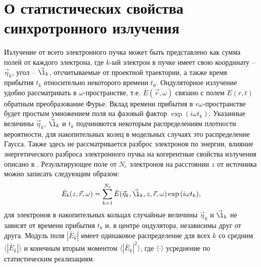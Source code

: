 \section{О статистических свойства синхротронного излучения}
Излучение от всего электронного пучка может быть представлено как сумма полей от каждого электрона, где $k$-ый электрон в пучке имеет свою координату -- $\vec{\eta}_k$, угол -- $\vec{\l}_k$, отсчитываемые от проектной траектории, а также время прибытия $t_k$ относительно некоторого времени $t_0$. Ондуляторное излучение удобно рассматривать в $\omega$-пространстве, т.е. $\bar{E}(\vec{r}, \omega)$ связано с полем $E(r, t)$ обратным преобразование Фурье. Вклад времени прибытия в $r\omega$-пространстве будет простым умножением поля на фазовый фактор $\exp{(i \omega t_k)}$. Указанные величины $\vec{\eta}_k$, $\vec{\l}_k$ и $t_k$ подчиняются некоторым распределениям плотности вероятности, для накопительных колец в модельных случаях это распределение Гаусса. Также здесь не рассматривается разброс электронов по энергии, влияние энергетического разброса электронного пучка на когерентные свойства излучения описано в \cite{geloni_effects_2018}. Результирующее поле от $N_e$ электронов на расстоянии $z$ от источника можно записать следующим образом:
\begin{align}
	\bar{E}_{b} (z, \vec{r}, \omega) = \sum\limits_{k=1}^{N_e} \bar{E}(\vec{\eta}_k, \vec{\l}_k, z, \vec{r}, \omega) \exp{(i \omega t_k)},
	\label{eq:E_bunch} 
\end{align}
для электронов в накопительных кольцах случайные величины $\vec{\eta}_k$ и $\vec{\l}_k$ не зависят от времени прибытия $t_k$ и, в центре ондулятора, независимы друг от друга. Модуль поля $|\bar{E}_k|$ имеет одинаковое распределение для всех $k$ со средним $\big \langle|\bar{E}_k|\big \rangle$ и конечным вторым моментом  $\big \langle|\bar{E}_k|^2\big \rangle$, где $\langle \cdot \rangle$ усреднение по статистическим реализациям.

